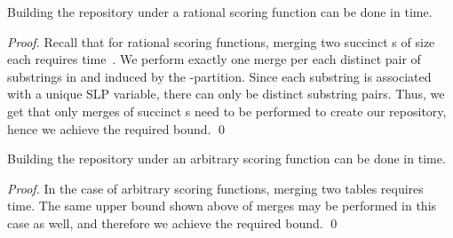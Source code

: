 \begin{lemma}
\label{Lemma: dist repository rational}Building the  repository under a rational scoring function
can be done in  time.
\end{lemma}
\begin{proof}
Recall that for rational scoring functions, merging two
succinct s of size  each requires 
time~\cite{Tiskin2009}. We perform exactly one merge per each
distinct pair of substrings in  and  induced by the
-partition. Since each substring is associated with a unique
SLP variable, there can only be  distinct
substring pairs. Thus, we get that only  merges of
succinct s need to be performed to create our
repository, hence we achieve the required bound. \qed
\end{proof}

\begin{lemma}
\label{Lemma: dist repository arbitrary}Building the  repository under an arbitrary scoring
function can be done in  time.
\end{lemma}
\begin{proof}
In the case of arbitrary scoring functions, merging two
  tables requires  time. The same
upper bound shown above of  merges may be performed in
this case as well, and therefore we achieve the required bound.
\qed
\end{proof}
